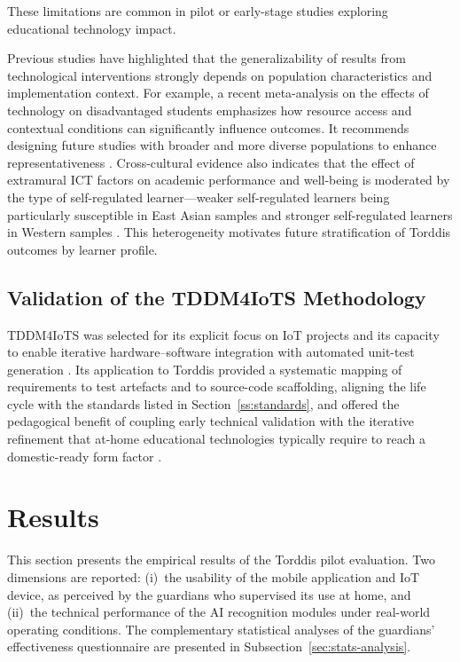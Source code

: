 These limitations are common in pilot or early-stage studies exploring educational technology impact.

Previous studies have highlighted that the generalizability of results from technological interventions strongly depends on population characteristics and implementation context. For example, a recent meta-analysis on the effects of technology on disadvantaged students emphasizes how resource access and contextual conditions can significantly influence outcomes. It recommends designing future studies with broader and more diverse populations to enhance representativeness \citep{DiPietro2025Meta}. Cross-cultural evidence also indicates that the effect of extramural ICT factors on academic performance and well-being is moderated by the type of self-regulated learner---weaker self-regulated learners being particularly susceptible in East Asian samples and stronger self-regulated learners in Western samples \citep{Chen2024Extramural}. This heterogeneity motivates future stratification of Torddis outcomes by learner profile.

\subsection{Validation of the TDDM4IoTS Methodology}
TDDM4IoTS \citep{Guerrero-Ulloa2020TDDM4IoTS} was selected for its explicit focus on IoT projects and its capacity to enable iterative hardware--software integration with automated unit-test generation \citep{Guerrero-Ulloa2023Nawi,Guerrero2024Test}. Its application to Torddis provided a systematic mapping of requirements to test artefacts and to source-code scaffolding, aligning the life cycle with the standards listed in Section~\ref{ss:standards}, and offered the pedagogical benefit of coupling early technical validation with the iterative refinement that at-home educational technologies typically require to reach a domestic-ready form factor \citep{Borte2024Learning,Wang2025Development}.

\section{Results}
\label{section:sixth}
This section presents the empirical results of the Torddis pilot evaluation. Two dimensions are reported: (i)~the usability of the mobile application and IoT device, as perceived by the guardians who supervised its use at home, and (ii)~the technical performance of the AI recognition modules under real-world operating conditions. The complementary statistical analyses of the guardians' effectiveness questionnaire are presented in Subsection~\ref{sec:stats-analysis}.

